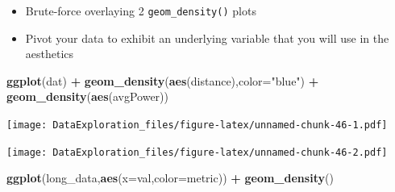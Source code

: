\documentclass[
]{book}
\newenvironment{Shaded}{\begin{snugshade}}{\end{snugshade}}
\newcommand{\DataTypeTok}[1]{\textcolor[rgb]{0.13,0.29,0.53}{#1}}
\newcommand{\KeywordTok}[1]{\textcolor[rgb]{0.13,0.29,0.53}{\textbf{#1}}}
\newcommand{\NormalTok}[1]{#1}
\newcommand{\OperatorTok}[1]{\textcolor[rgb]{0.81,0.36,0.00}{\textbf{#1}}}
\newcommand{\StringTok}[1]{\textcolor[rgb]{0.31,0.60,0.02}{#1}}
\providecommand{\tightlist}{%
  \setlength{\itemsep}{0pt}\setlength{\parskip}{0pt}}
\begin{document}
\begin{itemize}
\tightlist
\item
  Brute-force overlaying 2 \texttt{geom\_density()} plots
\item
  Pivot your data to exhibit an underlying variable that you will use in the aesthetics
\end{itemize}

\begin{Shaded}
\begin{Highlighting}[]
\KeywordTok{ggplot}\NormalTok{(dat) }\OperatorTok{+}\StringTok{ }\KeywordTok{geom_density}\NormalTok{(}\KeywordTok{aes}\NormalTok{(distance),}\DataTypeTok{color=}\StringTok{"blue"}\NormalTok{) }\OperatorTok{+}\StringTok{ }
\StringTok{  }\KeywordTok{geom_density}\NormalTok{(}\KeywordTok{aes}\NormalTok{(avgPower))}
\end{Highlighting}
\end{Shaded}

\texttt{[image: DataExploration\_files/figure-latex/unnamed-chunk-46-1.pdf]}

\begin{Shaded}
\end{Shaded}

\texttt{[image: DataExploration\_files/figure-latex/unnamed-chunk-46-2.pdf]}

\begin{Shaded}
\begin{Highlighting}[]
\KeywordTok{ggplot}\NormalTok{(long_data,}\KeywordTok{aes}\NormalTok{(}\DataTypeTok{x=}\NormalTok{val,}\DataTypeTok{color=}\NormalTok{metric)) }\OperatorTok{+}\StringTok{ }\KeywordTok{geom_density}\NormalTok{()}
\end{Highlighting}
\end{Shaded}
\end{document}
